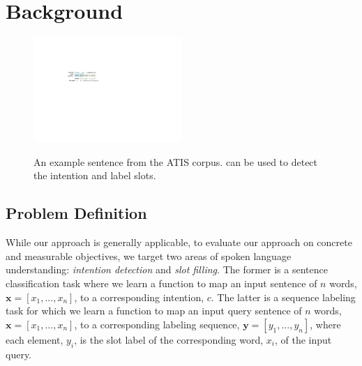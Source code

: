 \section{Background}
\begin{figure}[t!]
  \centering
  \includegraphics[width=0.5\textwidth]{figure/motivation.pdf}\\
  \caption{An example sentence from the ATIS corpus. \REs can be used to detect the intention and label slots.}\label{atis_sample}
\end{figure}

\subsection{Problem Definition}
While our approach is generally applicable, to evaluate our approach on concrete and measurable objectives, we target two areas of spoken
language understanding: \emph{intention detection} and \emph{slot filling}. The former is a sentence classification task where we learn a
function to map an input sentence of $n$ words, $\textbf{x}=[x_{1}, ..., x_{n}]$, to a corresponding intention, $c$. The latter is a
sequence labeling task for which we learn a function to map an input query sentence of $n$ words, $\textbf{x}=[x_{1}, ..., x_{n}]$, to a
corresponding labeling sequence, $\textbf{y}=[y_{1}, ..., y_{n}]$, where each element, $y_i$, is the slot label of the corresponding word,
$x_i$,  of the input query.


%

